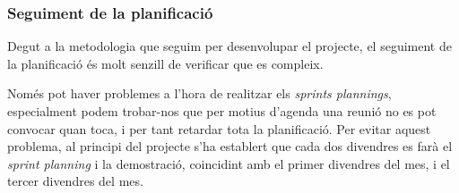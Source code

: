 \subsubsection{Seguiment de la planificació}

Degut a la metodologia que seguim per desenvolupar el projecte, el seguiment de la planificació és molt senzill de verificar que es compleix.

Només pot haver problemes a l’hora de realitzar els \textit{sprints plannings}, especialment podem trobar-nos que per motius d’agenda una reunió no es pot convocar quan toca, i per tant retardar tota la planificació.
Per  evitar aquest problema, al principi del projecte s’ha establert que cada dos divendres es farà el \textit{sprint planning} i la demostració, coincidint amb el primer divendres del mes, i el tercer divendres del mes.